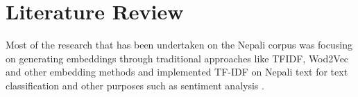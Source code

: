 \chapter{Literature Review}
Most of the research that has been undertaken on the Nepali corpus was focusing on generating embeddings through traditional approaches like TFIDF, Wod2Vec and other embedding methods and implemented TF-IDF on Nepali text for text classification and other purposes such as sentiment analysis \cite{Bhatta_Shrestha_Nepal_Pandey_Koirala_2020} \cite{Singh2019NepaliMT} \cite{shahi2018nepali} \cite{ghosh2018class}.